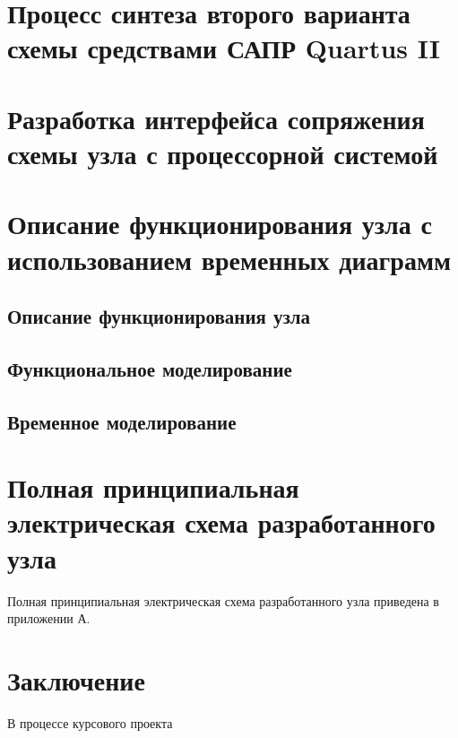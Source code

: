 \documentclass[a4paper,14pt,russian]{article}
\begin{document}
\section{Процесс синтеза второго варианта схемы средствами САПР Quartus II}


\section{Разработка интерфейса сопряжения схемы узла с процессорной системой}
\label{sections:iface}


\section{Описание функционирования узла с использованием временных диаграмм}
\subsection{Описание функционирования узла}

\subsection{Функциональное моделирование} 

\subsection{Временное моделирование}


\section{Полная принципиальная электрическая схема разработанного узла}
Полная принципиальная электрическая схема разработанного узла приведена в приложении А.

\section*{Заключение}
В процессе курсового проекта

\renewcommand\refname{Список использованных источников}
\nocite{*}


\clearpage
\appendix
\end{document}
